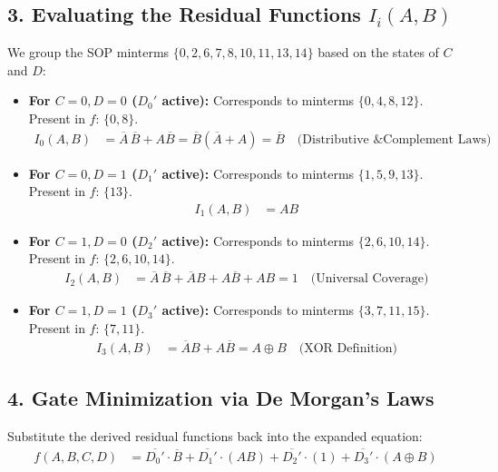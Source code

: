 \documentclass[12pt,a3paper]{article}
\begin{document}
\begin{enumerate}
\begin{tcolorbox}[enhanced,breakable,ansbox,colback=cD!4,colframe=cD,boxrule=0.8pt,arc=5pt,title={\textbf{Answer}},fonttitle=\bfseries\color{white},colbacktitle=cD]
\subsection*{3. Evaluating the Residual Functions $I_i(A, B)$}
We group the SOP minterms $\{0, 2, 6, 7, 8, 10, 11, 13, 14\}$ based on the states of $C$ and $D$:

\begin{itemize}
    \item \textbf{For $C=0, D=0$ ($D_0'$ active):} Corresponds to minterms $\{0, 4, 8, 12\}$.
    \newline Present in $f$: $\{0, 8\}$.
    \begin{align*}
        I_0(A, B) &= \overline{A}\,\overline{B} + A\overline{B} = \overline{B}(\overline{A} + A) = \overline{B} \quad \text{(Distributive \& Complement Laws)}
    \end{align*}
    
    \item \textbf{For $C=0, D=1$ ($D_1'$ active):} Corresponds to minterms $\{1, 5, 9, 13\}$.
    \newline Present in $f$: $\{13\}$.
    \begin{align*}
        I_1(A, B) &= AB
    \end{align*}
    
    \item \textbf{For $C=1, D=0$ ($D_2'$ active):} Corresponds to minterms $\{2, 6, 10, 14\}$.
    \newline Present in $f$: $\{2, 6, 10, 14\}$.
    \begin{align*}
        I_2(A, B) &= \overline{A}\,\overline{B} + \overline{A}B + A\overline{B} + AB = 1 \quad \text{(Universal Coverage)}
    \end{align*}
    
    \item \textbf{For $C=1, D=1$ ($D_3'$ active):} Corresponds to minterms $\{3, 7, 11, 15\}$.
    \newline Present in $f$: $\{7, 11\}$.
    \begin{align*}
        I_3(A, B) &= \overline{A}B + A\overline{B} = A \oplus B \quad \text{(XOR Definition)}
    \end{align*}
\end{itemize}

\subsection*{4. Gate Minimization via De Morgan's Laws}
Substitute the derived residual functions back into the expanded equation:
\begin{align*}
    f(A, B, C, D) &= \overline{D_0'} \cdot \overline{B} + \overline{D_1'} \cdot (AB) + \overline{D_2'} \cdot (1) + \overline{D_3'} \cdot (A \oplus B)
\end{align*}


\end{tcolorbox}
\end{enumerate}
\end{document}

